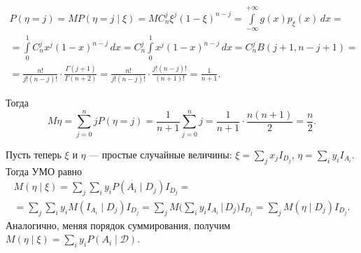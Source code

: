 
\addtocounter{ex}{-1}
\begin{ex}[продолжение]
\begin{multline*}
  P(\eta = j) = MP(\eta = j \mid \xi) = MC^j_n\xi^j(1-\xi)^{n-j} =
  \int\limits_{-\infty}^{+\infty}g(x) p_{\xi}(x)\,dx = \\
  = \int\limits_{0}^{1}C_n^jx^j(1-x)^{n-j}\,dx = C^j_n
  \int\limits_{0}^{1}x^j(1-x)^{n-j}\,dx
  = C^j_n B(j+1, n-j+1) = \\
  = \frac{n!}{j!(n-j)!} \cdot
  \frac{\Gamma(j+1)}{\Gamma(n+2)} = \frac{n!}{j!(n-j)!}\cdot
  \frac{j!(n-j)!}{(n+1)!} = \frac{1}{n+1}.
\end{multline*}
\end{ex}

Тогда  
\[
  M\eta = \sum_{j=0}^n j P(\eta = j) = \frac{1}{n+1}\sum_{j=0}^n j =
  \frac{1}{n+1} \cdot \frac{n(n+1)}{2} = \frac{n}{2}.
\]





\begin{definition}
  Пусть теперь $\xi$ и $\eta$ --- простые случайные величины:
  $\xi = \sum_j x_j I_{D_j}$, $\eta = \sum_i y_i I_{A_i}$.
  Тогда УМО равно
  \begin{multline*}
    M(\eta \mid \xi) = \sum_j \sum_i y_i P(A_i \mid D_j) I_{D_j} = \\ =
    \sum_j \sum_i y_i M(I_{A_i} \mid D_j) I_{D_j} = 
    \sum_j M \bigg( \sum_i y_i I_{A_i} \, \Big| \, D_j \bigg) I_{D_j}
    = \sum_j M(\eta \mid D_j) I_{D_j}.
  \end{multline*}
  Аналогично, меняя порядок суммирования, получим $ M(\eta\mid\xi)= \sum_i y_i
  P(A_i \mid \mathscr{D}) $.
\end{definition}

